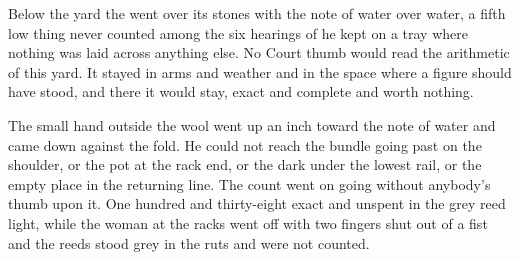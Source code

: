 Below the yard the  went over its stones with the note of water over water, a fifth low thing never counted among the six hearings of  he kept on a tray where nothing was laid across anything else. No Court thumb would read the arithmetic of this yard. It stayed in arms and weather and in the space where a figure should have stood, and there it would stay, exact and complete and worth nothing.

The small hand outside the wool went up an inch toward the note of water and came down against the fold. He could not reach the bundle going past on the shoulder, or the pot at the rack end, or the dark under the lowest rail, or the empty place in the returning line. The count went on going without anybody's thumb upon it. One hundred and thirty-eight exact and unspent in the grey reed light, while the woman at the racks went off with two fingers shut out of a fist and the reeds stood grey in the ruts and were not counted.
